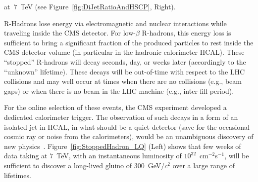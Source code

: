 \documentclass{cmspaper}
\begin{document}
at~$7$~TeV (see Figure~\ref{fig:DiJetRatioAndHSCP}, Right).
%
%

R-Hadrons lose energy via electromagnetic and nuclear interactions 
while traveling inside the CMS detector. For low-$\beta$ R-hadrons, this energy loss is 
sufficient to bring a significant fraction of the produced particles 
to rest inside the CMS detector volume (in particular in the hadronic calorimeter HCAL). 
These ``stopped'' R-hadrons will decay seconds, day, or weeks later (accordingly to
the ``unknown'' lifetime). These decays will be out-of-time with respect to the LHC collisions 
and may well occur at times when there are no collisions (e.g., beam gaps) or when there is no beam in 
the LHC machine (e.g., inter-fill period).

For the online selection of these events, the CMS experiment 
developed a dedicated calorimeter trigger. The observation of such decays in a form of an isolated jet 
in HCAL, in what should be a quiet detector (save for the occasional cosmic ray or noise from the 
calorimeters), would be an unambiguous discovery of new physics~\cite{StoppedGluinoPAS}. 
Figure~\ref{fig:StoppedHadron_LQ} (Left) shows 
that few weeks of data taking at $7$~TeV, with an instantaneous luminosity of  $10^{32}$~cm$^{-2}$s$^{-1}$, 
will be sufficient to discover a long-lived gluino of 300~GeV/$c^2$ over a large range of lifetimes.
\end{document}
